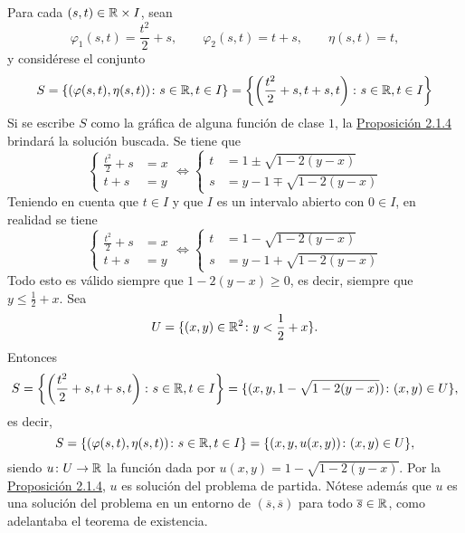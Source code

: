 \documentclass[a4paper, 12pt, extrafontsizes]{memoir}
\begin{document}
\begin{example}
\begin{itemize}
    \end{itemize}
    Para cada $(s,t) \in \mathbb R \times I$, sean
    \[\varphi_1(s,t) = \frac{t^2}{2}+s, \qquad \varphi_2(s,t) = t+s, \qquad \eta(s,t) = t,\]
    y considérese el conjunto
    \[S =  \left\{(\varphi(s,t),\eta(s,t)) \colon s \in \mathbb R, t \in I\right\} = \left\{\left(\frac{t^2}{2}+s,t+s,t\right) \colon s \in \mathbb R, t \in I\right\}\]
    Si se escribe $S$ como la gráfica de alguna función de clase $1$, la \hyperref[pro:2.1.4]{\color{gray}Proposición 2.1.4} brindará la solución buscada. Se tiene que
    \[
        \left\{\begin{alignedat}{2}
            \frac{t^2}{2}+s &= x \\
            t+s &= y
        \end{alignedat}\right. \iff \left\{\begin{alignedat}{2}
            t &= 1 \pm \sqrt{1-2(y-x)} \\
            s &= y -1 \mp \sqrt{1-2(y-x)}
        \end{alignedat}\right.
    \]
    Teniendo en cuenta que $t \in I$ y que $I$ es un intervalo abierto con $0 \in I$, en realidad se tiene
    \[
        \left\{\begin{alignedat}{2}
            \frac{t^2}{2}+s &= x \\
            t+s &= y
        \end{alignedat}\right. \iff \left\{\begin{alignedat}{2}
            t &= 1 - \sqrt{1-2(y-x)} \\
            s &= y -1 + \sqrt{1-2(y-x)}
        \end{alignedat}\right.
    \]
    Todo esto es válido siempre que $1-2(y-x) \geq 0$, es decir, siempre que $ y \leq \frac{1}{2}+x$. Sea
    \[U = \{(x,y) \in \mathbb R^2 \colon y < \frac{1}{2}+x\}.\]
    Entonces
    \[S =  \left\{\left(\frac{t^2}{2}+s,t+s,t\right) \colon s \in \mathbb R, t \in I\right\} = \{(x,y,1-\sqrt{1-2(y-x)}) \colon (x,y) \in U \},\]
    es decir,
    \[S =  \left\{(\varphi(s,t),\eta(s,t)) \colon s \in \mathbb R, t \in I\right\} = \{(x,y,u(x,y)) \colon (x,y) \in U \},\]
    siendo $u \colon U \to \mathbb R$ la función dada por $u(x,y) = 1-\sqrt{1-2(y-x)}$. Por la \hyperref[pro:2.1.4]{\color{gray}Proposición 2.1.4}, $u$ es solución del problema de partida. Nótese además que $u$ es una solución del problema en un entorno de $(\overline{s},\overline{s})$ para todo $\overline{s} \in \mathbb R$, como adelantaba el teorema de existencia.
\end{example}
\end{document}
